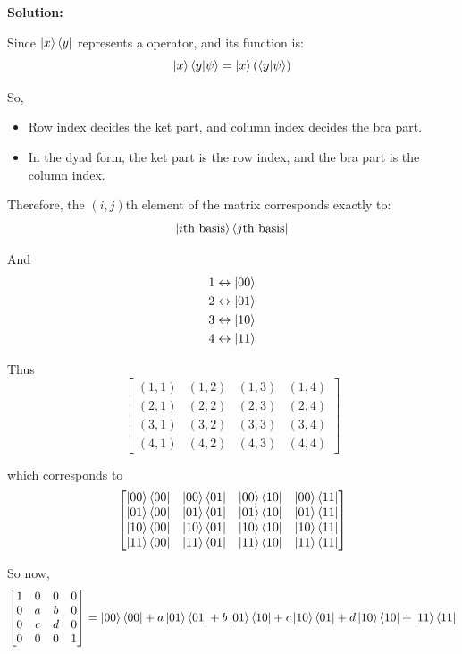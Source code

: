 \documentclass[11pt]{article}
\newenvironment{solution}
{\par\noindent\textbf{Solution:}\par}
{\vspace{1em}}
\begin{document}
\begin{solution}
Since $\ket{x}\bra{y}$ represents a operator, and its function is:\[\ket{x}\bra{y}\ket{\psi} = \ket{x}\left(\bra{y}\ket{\psi}\right)\]

So,
\begin{itemize}[itemsep=0em]
    \item Row index decides the ket part, and column index decides the bra part.
    \item In the dyad form, the ket part is the row index, and the bra part is the column index.
\end{itemize}

Therefore, the $(i,j)$th element of the matrix corresponds exactly to: \[\ket{i \text{th basis}}\bra{j \text{th basis}}\]

And \begin{align*}
    1 &\leftrightarrow \ket{00} \\ 
    2 &\leftrightarrow \ket{01} \\ 
    3 &\leftrightarrow \ket{10} \\ 
    4 &\leftrightarrow \ket{11}
\end{align*}

Thus \[\begin{bmatrix}(1,1) & (1,2) & (1,3) & (1,4) \\ (2,1) & (2,2) & (2,3) & (2,4) \\ (3,1) & (3,2) & (3,3) & (3,4) \\ (4,1) & (4,2) & (4,3) & (4,4)\end{bmatrix}\]

which corresponds to \[\begin{bmatrix}\ket{00}\bra{00} & \ket{00}\bra{01} & \ket{00}\bra{10} & \ket{00}\bra{11} \\ \ket{01}\bra{00} & \ket{01}\bra{01} & \ket{01}\bra{10} & \ket{01}\bra{11} \\ \ket{10}\bra{00} & \ket{10}\bra{01} & \ket{10}\bra{10} & \ket{10}\bra{11} \\ \ket{11}\bra{00} & \ket{11}\bra{01} & \ket{11}\bra{10} & \ket{11}\bra{11}\end{bmatrix}\]

So now,
\[\begin{bmatrix}1 & 0 & 0 & 0 \\ 0 & a & b & 0 \\ 0 & c & d & 0 \\ 0 & 0 & 0 & 1 \end{bmatrix} = \ket{00}\bra{00} + a\ket{01}\bra{01} + b\ket{01}\bra{10} + c\ket{10}\bra{01} + d\ket{10}\bra{10} + \ket{11}\bra{11}\]

\end{solution}
\end{document}
